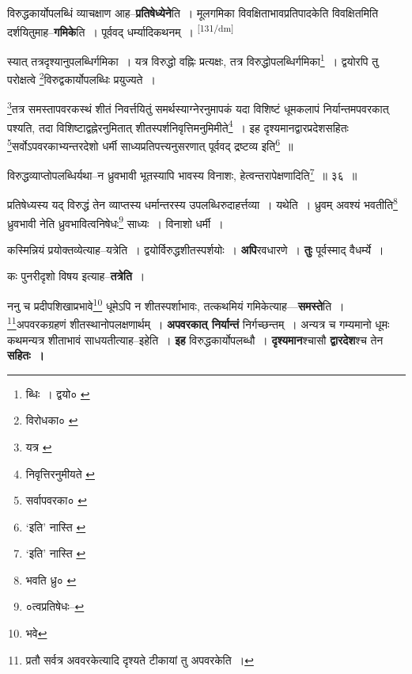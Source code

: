 \documentclass[article,12pt,a4paper]{memoir}
\begin{document}
	  \pstart विरुद्धकार्योपलब्धिं व्याचक्षाण आह--\textbf{प्रतिषेध्येने}ति । मूलगमिका विवक्षिताभावप्रतिपादकेति विवक्षितमिति दर्शयितुमाह--\textbf{गमिके}ति । पूर्ववद् धर्म्यादिकथनम् ।
	\pend
      \leavevmode\textsuperscript{\rmlatinfont\tiny [131/dm]}

	  \pstart स्यात् तत्रदृश्यानुपलब्धिर्गमिका । यत्र विरुद्धो वह्निः प्रत्यक्षः, तत्र विरुद्धोपलब्धिर्गमिका\footnote{ब्धिः । द्वयो० \cite{dp-msA} \cite{dp-msB} \cite{dp-edP} \cite{dp-edH} \cite{dp-edE} \cite{dp-edN}} । द्वयोरपि तु परोक्षत्वे \footnote{विरोधका० \cite{dp-msA}}विरुद्वकार्योपलब्धिः प्रयुज्यते ।
	\pend
       

	  \pstart \footnote{यत्र \cite{dp-msA}}तत्र समस्तापवरकस्थं शीतं निवर्त्तयितुं समर्थस्याग्नेरनुमापकं यदा विशिष्टं धूमकलापं निर्यान्तमपवरकात् पश्यति, तदा विशिष्टाद्वह्नेरनुमितात् शीतस्पर्शनिवृत्तिमनुमिमीते\footnote{निवृत्तिरनुमीयते \cite{dp-msA} \cite{dp-msC}} । इह दृश्यमानद्वारप्रदेशसहितः \footnote{सर्वापवरका० \cite{dp-msA} \cite{dp-edP} \cite{dp-edH} \cite{dp-edE} \cite{dp-edN}}सर्वोऽपवरकाभ्यन्तरदेशो धर्मी साध्यप्रतिपत्त्यनुसरणात् पूर्ववद् द्रष्टव्य इति\footnote{‘इति’ नास्ति \cite{dp-msA} \cite{dp-msB} \cite{dp-msC} \cite{dp-edP} \cite{dp-edH} \cite{dp-edE} \cite{dp-edN}} ॥
	\pend
       

	  \pstart विरुद्धव्याप्तोपलब्धिर्यथा--न ध्रुवभावी भूतस्यापि भावस्य विनाशः, हेत्वन्तरापेक्षणादिति\footnote{‘इति’ नास्ति \cite{dp-edE}} ॥ ३६ ॥
	\pend
       

	  \pstart प्रतिषेध्यस्य यद् विरुद्धं तेन व्याप्तस्य धर्मान्तरस्य उपलब्धिरुदाहर्त्तव्या । यथेति । ध्रुवम् अवश्यं भवतीति\footnote{भवति ध्रु० \cite{dp-msB} \cite{dp-msC} \cite{dp-msD}} ध्रुवभावी नेति ध्रुवभावित्वनिषेधः\footnote{०त्वप्रतिषेधः--\cite{dp-msC}} साध्यः । विनाशो धर्मी ।
	\pend
      

	  \pstart कस्मिन्नियं प्रयोक्तव्येत्याह--यत्रेति । द्वयोर्विरुद्धशीतस्पर्शयोः । \textbf{अपि}रवधारणे । \textbf{तुः} पूर्वस्माद् वैधर्म्ये ।
	\pend
      

	  \pstart कः पुनरीदृशो विषय इत्याह--\textbf{तत्रेति} ।
	\pend
      

	  \pstart ननु च प्रदीपशिखाप्रभावे\footnote{भवे} धूमेऽपि न शीतस्पर्शाभावः, तत्कथमियं गमिकेत्याह—\textbf{समस्ते}ति । \footnote{प्रतौ सर्वत्र अववरकेत्यादि दृश्यते टीकायां तु अपवरकेति ।}अपवरकग्रहणं शीतस्थानोपलक्षणार्थम् । \textbf{अपवरकात् निर्यान्तं} निर्गच्छन्तम् । अन्यत्र च गम्यमानो धूमः कथमन्यत्र शीताभावं साधयतीत्याह--इहेति । \textbf{इह} विरुद्धकार्योपलब्धौ । \textbf{दृश्यमान}श्चासौ \textbf{द्वारदेश}श्च तेन \textbf{सहितः ।}
	\pend
      
\end{document}
